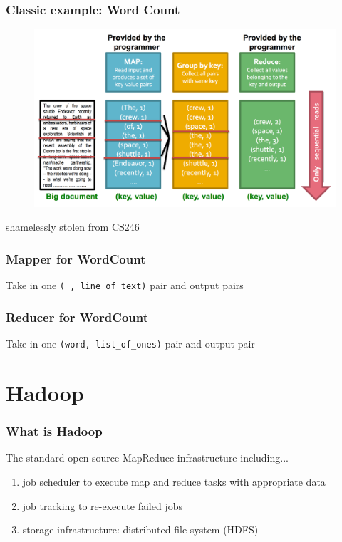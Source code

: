 \documentclass{beamer}
\begin{document}
\begin{frame}
\frametitle{Classic example: Word Count}
\begin{figure}[h]
\centering
\includegraphics[width=.95\textwidth]{images/wordcount.png}
\end{figure}
shamelessly stolen from CS246
\end{frame}

\begin{frame}
\frametitle{Mapper for WordCount}
Take in one \texttt{(\_, line\_of\_text)} pair and output  pairs
\end{frame}

\begin{frame}
\frametitle{Reducer for WordCount}
Take in one \texttt{(word, list\_of\_ones)} pair and output   pair
\end{frame}





\section{Hadoop}

\begin{frame}
\frametitle{What is Hadoop}

The standard open-source MapReduce infrastructure including...
\begin{enumerate}
\item job scheduler to execute map and reduce tasks with appropriate data 
\item job tracking to re-execute failed jobs
\item storage infrastructure: distributed file system (HDFS)
\end{enumerate}
\end{frame}
\end{document}
